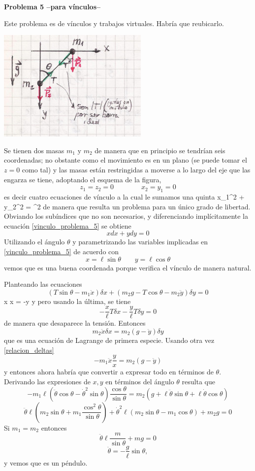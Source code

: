 \documentclass[10pt,oneside]{CBFT_book}
\begin{document}
\begin{ejemplo}{\bf Problema 5 --para vínculos--}

Este problema es de vínculos y trabajos virtuales. Habría que reubicarlo.

\includegraphics[scale=0.35]{images/fig_mc_oscilador_barra.jpg}

Se tienen dos masas $m_1$ y $m_2$ de manera que en principio se tendrían seis coordenadas; no obstante como el movimiento
es en un plano (se puede tomar el $z=0$ como tal) y las masas están restringidas a moverse a lo largo del eje que las
engarza se tiene, adoptando el esquema de la figura,
\[
	z_1 = z_2 = 0 \qquad \qquad x_2 = y_1 = 0
\]
es decir cuatro ecuaciones de vínculo a la cual le sumamos una quinta
\be
	x_1^2 + y_2^2 = \ell^2
	\label{vinculo_problema_5}
\ee
de manera que resulta un problema para un único grado de libertad. Obviando los subíndices que no son necesarios, y diferenciando
implícitamente la ecuación \eqref{vinculo_problema_5} se obtiene 
\[
	x dx + y dy = 0 
\]
Utilizando el ángulo $\theta$ y parametrizando las variables implicadas en \eqref{vinculo_problema_5} de acuerdo con 
\[
	x = \ell \sin \theta \qquad y = \ell \cos \theta
\]
vemos que es una buena coordenada porque verifica el vínculo de manera natural.

Planteando las ecuaciones 
\[
	( T \sin \theta - m_1 \ddot{x} ) \delta x + ( m_2 g - T \cos \theta - m_2 \ddot{y} ) \delta y = 0
\]
\be
	x \delta x = -y \delta y
	\label{relacion_deltas}
\ee
pero usando la última, se tiene
\[
	-\frac{x}{\ell}T\delta x - \frac{y}{\ell}T\delta y = 0 
\]
de manera que desaparece la tensión. Entonces
\[
	m_2 \ddot{x} \delta x = m_2 (g - \ddot{y}) \delta y
\]
que es una ecuación de Lagrange de primera especie. Usando otra vez \eqref{relacion_deltas}
\[
	- m_1 \ddot{x} \frac y x = m_2 (g - \ddot{y})
\]
y entonces ahora habría que convertir a expresar todo en términos de $\theta$. Derivando las expresiones de $x,y$ en términos
del ángulo $\theta$ resulta que 
\[
	-m_1 \ell ( \ddot{\theta} \cos \theta - \dot{\theta}^2 \sin \theta ) \frac{\cos \theta}{\sin \theta}  = 
	m_2 ( g + \ell \ddot{\theta} \sin \theta + \ell \dot{\theta} \cos \theta )
\]
\[
	\ddot{ \theta } \ell ( m_2 \sin \theta + m_1 \frac{\cos^2 \theta}{\sin \theta} ) + 
	\dot{\theta}^2 \ell (m_2 \sin \theta - m_1 \cos \theta ) + m_2 g = 0
\]
Si $ m_1 = m_2 $ entonces
\[
	\ddot{ \theta } \ell \frac{m}{\sin \theta} + m  g = 0 
\]
\[
	\ddot{ \theta } = -\frac{ g }{ \ell } \sin \theta,
\]
y vemos que es un péndulo.


\end{ejemplo}
\end{document}
